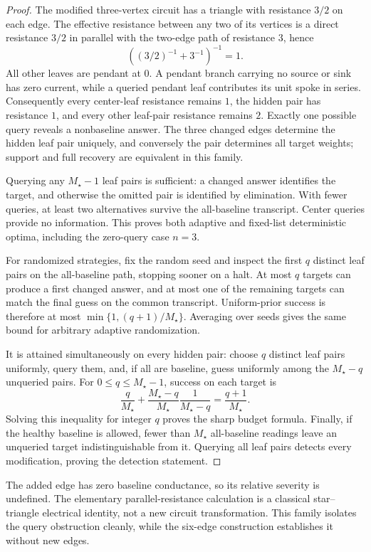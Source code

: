 \documentclass[11pt,letterpaper]{article}
\begin{document}
\begin{proof}
The modified three-vertex circuit has a triangle with resistance $3/2$ on each edge. The effective resistance between any two of its vertices is a direct resistance $3/2$ in parallel with the two-edge path of resistance $3$, hence
\[
 \left((3/2)^{-1}+3^{-1}\right)^{-1}=1.
\]
All other leaves are pendant at $0$. A pendant branch carrying no source or sink has zero current, while a queried pendant leaf contributes its unit spoke in series. Consequently every center-leaf resistance remains $1$, the hidden pair has resistance $1$, and every other leaf-pair resistance remains $2$. Exactly one possible query reveals a nonbaseline answer. The three changed edges determine the hidden leaf pair uniquely, and conversely the pair determines all target weights; support and full recovery are equivalent in this family.

Querying any $M_\star-1$ leaf pairs is sufficient: a changed answer identifies the target, and otherwise the omitted pair is identified by elimination. With fewer queries, at least two alternatives survive the all-baseline transcript. Center queries provide no information. This proves both adaptive and fixed-list deterministic optima, including the zero-query case $n=3$.

For randomized strategies, fix the random seed and inspect the first $q$ distinct leaf pairs on the all-baseline path, stopping sooner on a halt. At most $q$ targets can produce a first changed answer, and at most one of the remaining targets can match the final guess on the common transcript. Uniform-prior success is therefore at most $\min\{1,(q+1)/M_\star\}$. Averaging over seeds gives the same bound for arbitrary adaptive randomization.

It is attained simultaneously on every hidden pair: choose $q$ distinct leaf pairs uniformly, query them, and, if all are baseline, guess uniformly among the $M_\star-q$ unqueried pairs. For $0\le q\le M_\star-1$, success on each target is
\[
 \frac q{M_\star}+\frac{M_\star-q}{M_\star}
                  \frac1{M_\star-q}=\frac{q+1}{M_\star}.
\]
Solving this inequality for integer $q$ proves the sharp budget formula. Finally, if the healthy baseline is allowed, fewer than $M_\star$ all-baseline readings leave an unqueried target indistinguishable from it. Querying all leaf pairs detects every modification, proving the detection statement.
\end{proof}

The added edge has zero baseline conductance, so its relative severity is undefined. The elementary parallel-resistance calculation is a classical star--triangle electrical identity, not a new circuit transformation. This family isolates the query obstruction cleanly, while the six-edge construction establishes it without new edges.
\end{document}
